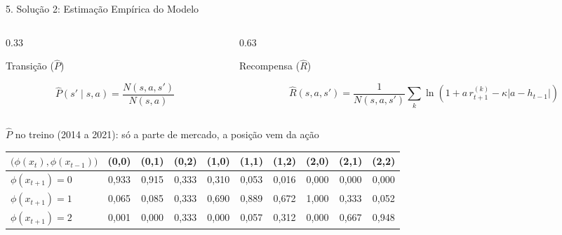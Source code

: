 \documentclass[aspectratio=169,10pt,t]{beamer}
\newenvironment{altura}[2][c]{\begin{minipage}[t][#2][#1]{\linewidth}}{\end{minipage}}
\begin{document}
\begin{frame}{5. Solução 2: Estimação Empírica do Modelo}

  \begin{columns}[T,onlytextwidth]
    \begin{column}{0.33\textwidth}
      \begin{block}{Transição ($\widehat{P}$)}
        \begin{altura}{1.7cm}
        \[
          \widehat{P}(s' \mid s, a) = \frac{N(s, a, s')}{N(s, a)}
        \]
        \end{altura}
      \end{block}
    \end{column}

    \begin{column}{0.63\textwidth}
      \begin{block}{Recompensa ($\widehat{R}$)}
        \begin{altura}{1.7cm}
        {\small
        \[
          \widehat{R}(s,a,s') = \frac{1}{N(s,a,s')} \sum_{k} \ln\left(1 + a \, r_{t+1}^{(k)} - \kappa |a - h_{t-1}|\right)
        \]
        }
        \end{altura}
      \end{block}
    \end{column}
  \end{columns}

  \vskip 0.1cm

  \begin{block}{$\widehat{P}$ no treino (2014 a 2021): só a parte de mercado, a posição vem da ação}
    \centering\footnotesize
    \renewcommand{\arraystretch}{1.25}
    \begin{tabular}{l ccccccccc}
      \toprule
      $\big(\phi(x_t), \phi(x_{t-1})\big)$ & (0,0) & (0,1) & (0,2) & (1,0) & (1,1) & (1,2) & (2,0) & (2,1) & (2,2) \\
      \midrule
      $\phi(x_{t+1}) = 0$ & 0,933 & 0,915 & 0,333 & 0,310 & 0,053 & 0,016 & 0,000 & 0,000 & 0,000 \\
      $\phi(x_{t+1}) = 1$ & 0,065 & 0,085 & 0,333 & 0,690 & 0,889 & 0,672 & 1,000 & 0,333 & 0,052 \\
      $\phi(x_{t+1}) = 2$ & 0,001 & 0,000 & 0,333 & 0,000 & 0,057 & 0,312 & 0,000 & 0,667 & 0,948 \\
      \bottomrule
    \end{tabular}
  \end{block}

\end{frame}
\end{document}
